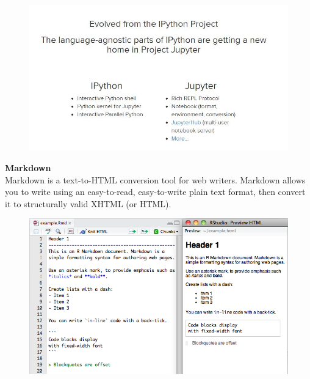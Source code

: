 \documentclass[MASTER.tex]{subfiles}
\begin{document}
\begin{frame}
	\begin{figure}
\centering
\includegraphics[width=1.0\linewidth]{jupytersiteinfo}

\end{figure}

\end{frame}
\begin{frame}
	\textbf{Markdown}
	\\
	Markdown is a text-to-HTML conversion tool for web writers. Markdown allows you to write using an easy-to-read, easy-to-write plain text format, then convert it to structurally valid XHTML (or HTML).
	\begin{figure}
\centering
\includegraphics[width=0.80\linewidth]{markdownOverview}

\end{figure}

\end{frame}

\end{document}
